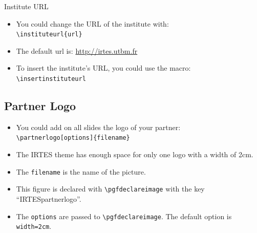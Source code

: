 \documentclass[english,circlenumberstyle]{irtesbeamer}
\begin{document}
\begin{frame}{Institute URL}
	\begin{itemize}
	\item You could change the URL of the institute with: \\
		\texttt{{\textbackslash}instituteurl\{url\}}
	\item The default url is: \url{http://irtes.utbm.fr}
	\item To insert the institute's URL, you could use the macro: \\
			\texttt{{\textbackslash}insertinstituteurl}
	\end{itemize}
\end{frame}

\subsection{Partner Logo}
\begin{frame}{\subsecname}
	\begin{itemize}
	\item You could add on all slides the logo of your partner: \\
		\texttt{{\textbackslash}partnerlogo[options]\{filename\}}
	\item The IRTES theme has enough space for only one logo with a width of 2cm.
	\item The \texttt{filename} is the name of the picture.
	\item This figure is declared with \texttt{{\textbackslash}pgfdeclareimage} with the key ``IRTESpartnerlogo''.
	\item The \texttt{options} are passed to \texttt{{\textbackslash}pgfdeclareimage}. The default option is \texttt{width=2cm}.
	\end{itemize}
\end{frame}
\end{document}
